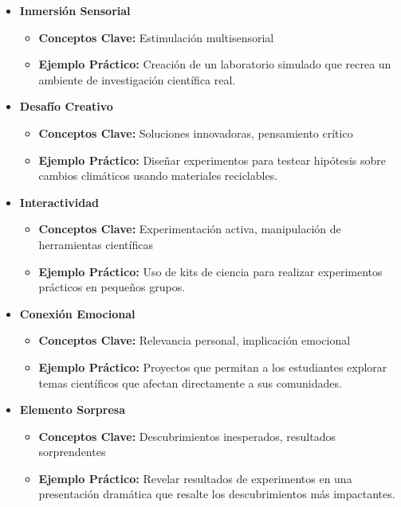 \begin{itemize}[label={}]
    \item \textbf{Inmersión Sensorial}
    \begin{itemize}
        \item \textbf{Conceptos Clave:} Estimulación multisensorial
        \item \textbf{Ejemplo Práctico:} Creación de un laboratorio simulado que recrea un ambiente de investigación científica real.
    \end{itemize}
    
    \item \textbf{Desafío Creativo}
    \begin{itemize}
        \item \textbf{Conceptos Clave:} Soluciones innovadoras, pensamiento crítico
        \item \textbf{Ejemplo Práctico:} Diseñar experimentos para testear hipótesis sobre cambios climáticos usando materiales reciclables.
    \end{itemize}
    
    \item \textbf{Interactividad}
    \begin{itemize}
        \item \textbf{Conceptos Clave:} Experimentación activa, manipulación de herramientas científicas
        \item \textbf{Ejemplo Práctico:} Uso de kits de ciencia para realizar experimentos prácticos en pequeños grupos.
    \end{itemize}
    
    \item \textbf{Conexión Emocional}
    \begin{itemize}
        \item \textbf{Conceptos Clave:} Relevancia personal, implicación emocional
        \item \textbf{Ejemplo Práctico:} Proyectos que permitan a los estudiantes explorar temas científicos que afectan directamente a sus comunidades.
    \end{itemize}
    
    \item \textbf{Elemento Sorpresa}
    \begin{itemize}
        \item \textbf{Conceptos Clave:} Descubrimientos inesperados, resultados sorprendentes
        \item \textbf{Ejemplo Práctico:} Revelar resultados de experimentos en una presentación dramática que resalte los descubrimientos más impactantes.
    \end{itemize}
    

\end{itemize}
